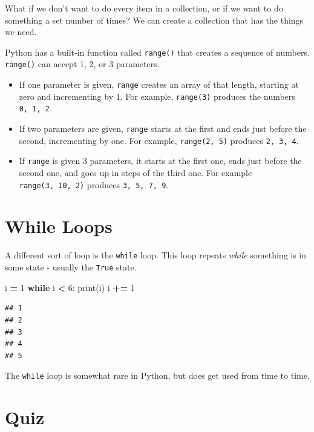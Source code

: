 \documentclass[]{book}
\newenvironment{Shaded}{\begin{snugshade}}{\end{snugshade}}
\newcommand{\BuiltInTok}[1]{#1}
\newcommand{\ControlFlowTok}[1]{\textcolor[rgb]{0.13,0.29,0.53}{\textbf{#1}}}
\newcommand{\DecValTok}[1]{\textcolor[rgb]{0.00,0.00,0.81}{#1}}
\newcommand{\NormalTok}[1]{#1}
\newcommand{\OperatorTok}[1]{\textcolor[rgb]{0.81,0.36,0.00}{\textbf{#1}}}
\providecommand{\tightlist}{%
  \setlength{\itemsep}{0pt}\setlength{\parskip}{0pt}}
\theoremstyle{definition}
\theoremstyle{definition}
\theoremstyle{definition}
\theoremstyle{remark}
\begin{document}
What if we don't want to do every item in a collection, or if we want to
do something a set number of times? We can create a collection that has
the things we need.

Python has a built-in function called \texttt{range()} that creates a
sequence of numbers. \texttt{range()} can accept 1, 2, or 3 parameters.

\begin{itemize}
\tightlist
\item
  If one parameter is given, \texttt{range} creates an array of that
  length, starting at zero and incrementing by 1. For example,
  \texttt{range(3)} produces the numbers \texttt{0,\ 1,\ 2}.
\item
  If two parameters are given, \texttt{range} starts at the first and
  ends just before the second, incrementing by one. For example,
  \texttt{range(2,\ 5)} produces \texttt{2,\ 3,\ 4}.
\item
  If \texttt{range} is given 3 parameters, it starts at the first one,
  ends just before the second one, and goes up in steps of the third
  one. For example \texttt{range(3,\ 10,\ 2)} produces
  \texttt{3,\ 5,\ 7,\ 9}.
\end{itemize}

\hypertarget{while-loops}{%
\section{While Loops}\label{while-loops}}

A different sort of loop is the \texttt{while} loop. This loop repeats
\emph{while} something is in some state - usually the \texttt{True}
state.

\begin{Shaded}
\begin{Highlighting}[]
\NormalTok{i }\OperatorTok{=} \DecValTok{1}
\ControlFlowTok{while}\NormalTok{ i }\OperatorTok{<} \DecValTok{6}\NormalTok{:}
  \BuiltInTok{print}\NormalTok{(i)}
\NormalTok{  i }\OperatorTok{+=} \DecValTok{1}
\end{Highlighting}
\end{Shaded}

\begin{verbatim}
## 1
## 2
## 3
## 4
## 5
\end{verbatim}

The \texttt{while} loop is somewhat rare in Python, but does get used
from time to time.

\hypertarget{quiz-3}{%
\section{Quiz}\label{quiz-3}}
\end{document}
